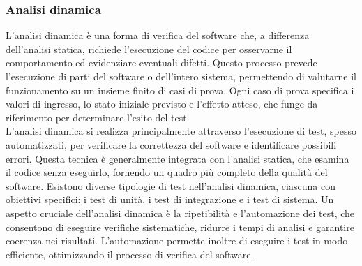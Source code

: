 \subsubsection{Analisi dinamica}
L'analisi dinamica è una forma di verifica del software che, a differenza dell'analisi statica, richiede l'esecuzione del codice per osservarne il comportamento ed evidenziare eventuali difetti. Questo processo prevede l'esecuzione di parti del software o dell'intero sistema, permettendo di valutarne il funzionamento su un insieme finito di casi di prova. Ogni caso di prova specifica i valori di ingresso, lo stato iniziale previsto e l'effetto atteso, che funge da riferimento per determinare l'esito del test. \\
L'analisi dinamica si realizza principalmente attraverso l'esecuzione di test, spesso automatizzati, per verificare la correttezza del software e identificare possibili errori. Questa tecnica è generalmente integrata con l'analisi statica, che esamina il codice senza eseguirlo, fornendo un quadro più completo della qualità del software. Esistono diverse tipologie di test nell'analisi dinamica, ciascuna con obiettivi specifici: i test di unità, i test di integrazione e i test di sistema. Un aspetto cruciale dell'analisi dinamica è la ripetibilità e l'automazione dei test, che consentono di eseguire verifiche sistematiche, ridurre i tempi di analisi e garantire coerenza nei risultati. L'automazione permette inoltre di eseguire i test in modo efficiente, ottimizzando il processo di verifica del software.